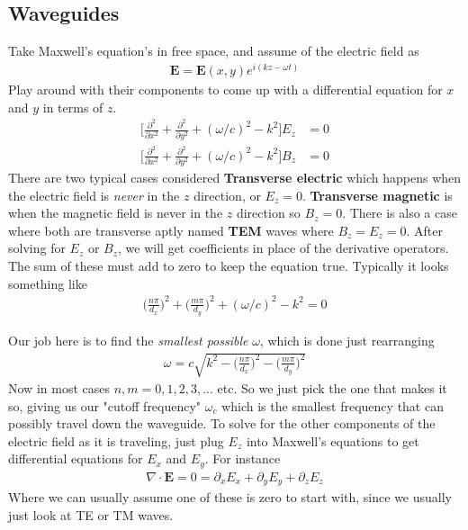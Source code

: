 \subsection{Waveguides}
Take Maxwell's equation's in free space, and assume of the electric field as
\begin{align}
    \textbf{E} = \textbf{E}(x,y)e^{i(kz-\omega t)}
\end{align}
Play around with their components to come up with a differential equation for $x$ and $y$ in terms of $z$.
\begin{align}
    \Big[\frac{\partial^2}{\partial x^2} + \frac{\partial^2}{\partial y^2} + (\omega/c)^2 - k^2\Big]E_z &= 0\\
    \Big[\frac{\partial^2}{\partial x^2} + \frac{\partial^2}{\partial y^2} + (\omega/c)^2 - k^2\Big]B_z &= 0
\end{align}
There are two typical cases considered \textbf{Transverse electric} which happens when the electric field is \emph{never} in the $z$ direction, or $E_z = 0$. \textbf{Transverse magnetic} is when the magnetic field is never in the $z$ direction so $B_z = 0$. There is also a case where both are transverse aptly named \textbf{TEM} waves where $B_z = E_z = 0$. After solving for $E_z$ or $B_z$, we will get coefficients in place of the derivative operators. The sum of these must add to zero to keep the equation true. Typically it looks something like
\begin{align}
    \Big(\frac{n\pi}{d_x}\Big)^2 + \Big(\frac{m\pi}{d_y}\Big)^2 + (\omega/c)^2 - k^2 = 0
\end{align}

Our job here is to find the \emph{smallest possible} $\omega$, which is done just rearranging
\begin{align}
    \omega = c\sqrt{k^2 -\Big(\frac{n\pi}{d_x}\Big)^2 - \Big(\frac{m\pi}{d_y}\Big)^2}
\end{align}
Now in most cases $n,m= 0,1,2,3, ...$ etc. So we just pick the one that makes it so, giving us our "cutoff frequency" $\omega_c$ which is the smallest frequency that can possibly travel down the waveguide. To solve for the other components of the electric field as it is traveling, just plug $E_z$ into Maxwell's equations to get differential equations for $E_x$ and $E_y$. For instance
\begin{align}
    \nabla\cdot\textbf{E} = 0 = \partial_x E_x + \partial_y E_y + \partial_z E_z
\end{align}
Where we can usually assume one of these is zero to start with, since we usually just look at TE or TM waves.





